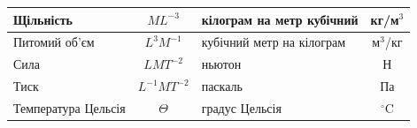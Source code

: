 \begin{table}[h]
\begin{tabular}{|>{\raggedright}m{5cm}|c|m{4cm}|c|}
Щільність & $ML^{-3}$ & кілограм на метр кубічний & кг/м$^3$ \\[0pt]\hline\vspace{4pt}
Питомий об'єм & $L^3M^{-1}$ & кубічний метр на кілограм & м$^3$/кг \\[0pt]\hline\vspace{4pt}
Сила & $LMT^{-2}$ & ньютон & Н \\[0pt]\hline\vspace{4pt}
Тиск & $L^{-1}MT^{-2}$ & паскаль & Па \\[0pt]\hline\vspace{4pt}
Температура Цельсія & $\Theta$ & градус Цельсія & $^\circ$C \\[0pt]\hline 
\end{tabular}
\end{table}